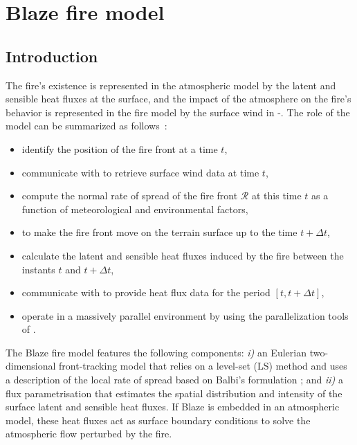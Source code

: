 
\chapter{Blaze fire model}
\minitoc

\section{Introduction}

The fire's existence is represented in the atmospheric model by the latent and sensible heat fluxes at the surface, and the impact of the atmosphere on the fire's behavior is represented in the fire model by the surface wind in \MNH-\Blaze.
The role of the \Blaze{} model can be summarized as follows~:
\begin{itemize}
	\item identify the position of the fire front at a time $t$,
	\item communicate with \MNH{} to retrieve surface wind data at time $t$,
	\item compute the normal rate of spread of the fire front $\mathcal R$ at this time $t$ as a function of meteorological and environmental factors,
	\item to make the fire front move on the terrain surface up to the time $t+\Delta t$,
	\item calculate the latent and sensible heat fluxes induced by the fire between the instants $t$ and $t+\Delta t$,
	\item communicate with \MNH{} to provide heat flux data for the period $[t,t+\Delta t]$,
	\item operate in a massively parallel environment by using the parallelization tools of \MNH.
\end{itemize}

The Blaze fire model features the following components: \textit{i)} an Eulerian two-dimensional front-tracking model that relies on a level-set (LS) method and uses a description of the local rate of spread based on Balbi’s formulation \citep{Balbi2009}; and \textit{ii)} a flux parametrisation that estimates the spatial distribution and intensity of the surface latent and sensible heat fluxes. If Blaze is embedded in an atmospheric model, these heat fluxes act as surface boundary conditions to solve the atmospheric flow perturbed by the fire.

